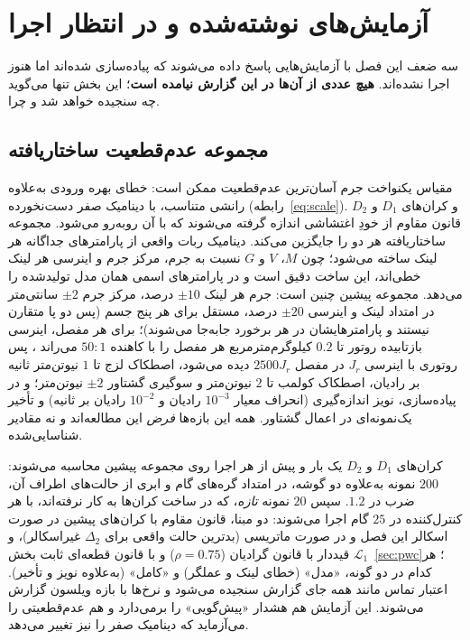 \documentclass[10pt,twocolumn]{article}
\newcommand{\en}[1]{\lr{#1}}
\newcommand{\md}{\lr{\textemdash}}
\begin{document}
\section{آزمایش‌های نوشته‌شده و در انتظار اجرا}
\label{sec:pending}
سه ضعف این فصل با آزمایش‌هایی پاسخ داده می‌شوند که پیاده‌سازی شده‌اند اما هنوز اجرا
نشده‌اند. \textbf{هیچ عددی از آن‌ها در این گزارش نیامده است}؛ این بخش تنها می‌گوید چه
سنجیده خواهد شد و چرا.

\subsection{مجموعه عدم‌قطعیت ساختاریافته}
\label{sec:structured}
مقیاس یکنواخت جرم آسان‌ترین عدم‌قطعیت ممکن است: خطای بهره ورودی به‌علاوه رانشی متناسب، با
دینامیک صفر دست‌نخورده (رابطه~\eqref{eq:scale}). و کران‌های $D_1$ و $D_2$ قانون مقاوم از
خودِ اغتشاشی اندازه گرفته می‌شوند که با آن روبه‌رو می‌شود. مجموعه ساختاریافته هر دو را
جایگزین می‌کند. دینامیک ربات واقعی از پارامترهای جداگانه هر لینک ساخته می‌شود؛ چون $M$، $V$
و $G$ نسبت به جرم، مرکز جرم و اینرسی هر لینک خطی‌اند، این ساخت دقیق است و در پارامترهای اسمی
همان مدل تولیدشده را می‌دهد. مجموعه پیشین چنین است: جرم هر لینک $\pm10$ درصد، مرکز جرم $\pm2$
سانتی‌متر در امتداد لینک و اینرسی $\pm20$ درصد، مستقل برای هر پنج جسم (پس دو پا متقارن
نیستند و پارامترهایشان در هر برخورد جابه‌جا می‌شوند)؛ برای هر مفصل، اینرسی بازتابیده روتور
تا $0.2$ کیلوگرم‌مترمربع\md{}\en{RABBIT} هر مفصل را با کاهنده $50:1$ می‌راند
\cite{chevallereau2003rabbit}، پس روتوری با اینرسی $J_r$ در مفصل $2500J_r$ دیده می‌شود\md{}،
اصطکاک لزج تا $1$ نیوتن‌متر ثانیه بر رادیان، اصطکاک کولمب تا $2$ نیوتن‌متر و سوگیری گشتاور $\pm2$
نیوتن‌متر؛ و در پیاده‌سازی، نویز اندازه‌گیری (انحراف معیار $10^{-3}$ رادیان و $10^{-2}$ رادیان
بر ثانیه) و تأخیر یک‌نمونه‌ای در اعمال گشتاور. همه این بازه‌ها \emph{فرض} این مطالعه‌اند و نه
مقادیر شناسایی‌شده.

کران‌های $D_1$ و $D_2$ یک بار و پیش از هر اجرا روی مجموعه پیشین محاسبه می‌شوند: $200$ نمونه
به‌علاوه دو گوشه، در امتداد گره‌های گام و ابری از حالت‌های اطراف آن، ضرب در $1.2$. سپس $20$
نمونه \emph{تازه}، که در ساخت کران‌ها به کار نرفته‌اند، با هر کنترل‌کننده در $25$ گام اجرا
می‌شوند: دو مبنا، قانون مقاوم با کران‌های پیشین در صورت اسکالر این فصل و در صورت ماتریسی
(بدترین حالت واقعی برای $\Delta_2$ غیراسکالر)، و $\mathcal{L}_1$ قیددار با قانون گرادیان
($\rho=0.75$) و با قانون قطعه‌ای ثابت بخش~\ref{sec:pwc}؛ هر کدام در دو گونه، «مدل» (خطای
لینک و عملگر) و «کامل» (به‌علاوه نویز و تأخیر). اعتبار تماس مانند همه جای گزارش سنجیده می‌شود
و نرخ‌ها با بازه ویلسون گزارش می‌شوند. این آزمایش هم هشدار «پیش‌گویی» را برمی‌دارد و هم
عدم‌قطعیتی را می‌آزماید که دینامیک صفر را نیز تغییر می‌دهد.
\end{document}
